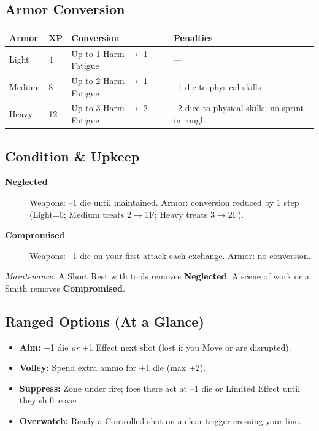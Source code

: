 \subsection{Armor Conversion}
\begin{center}
\begin{longtable}{llll}
\toprule
\textbf{Armor} & \textbf{XP} & \textbf{Conversion} & \textbf{Penalties} \\
\midrule
Light  & 4  & Up to 1 Harm $\rightarrow$ 1 Fatigue & --- \\
Medium & 8  & Up to 2 Harm $\rightarrow$ 1 Fatigue & --1 die to physical skills \\
Heavy  & 12 & Up to 3 Harm $\rightarrow$ 2 Fatigue & --2 dice to physical skills; no sprint in rough \\
\bottomrule
\end{longtable}
\end{center}

\subsection{Condition \& Upkeep}
\begin{description}
    \item[\textbf{Neglected}] Weapons: --1 die until maintained. Armor: conversion reduced by 1 step (Light=0; Medium treats 2$\rightarrow$1F; Heavy treats 3$\rightarrow$2F).
    \item[\textbf{Compromised}] Weapons: --1 die on your first attack each exchange. Armor: no conversion.
\end{description}
\textit{Maintenance:} A Short Rest with tools removes \textbf{Neglected}. A scene of work or a Smith removes \textbf{Compromised}.

\subsection{Ranged Options (At a Glance)}
\begin{itemize}
    \item \textbf{Aim:} +1 die \emph{or} +1 Effect next shot (lost if you Move or are disrupted).
    \item \textbf{Volley:} Spend extra ammo for +1 die (max +2).
    \item \textbf{Suppress:} Zone under fire; foes there act at --1 die or Limited Effect until they shift cover.
    \item \textbf{Overwatch:} Ready a Controlled shot on a clear trigger crossing your line.
\end{itemize}

